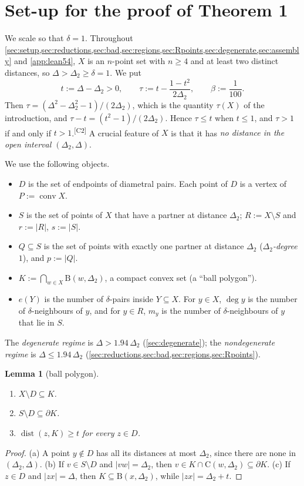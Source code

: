 \documentclass[11pt]{amsart}
\newtheorem{lemma}[theorem]{Lemma}
\theoremstyle{definition}
\theoremstyle{remark}
\newcommand{\Dt}{\Delta_2}
\newcommand{\conv}{\operatorname{conv}}
\newcommand{\dist}{\operatorname{dist}}
\newcommand{\Cc}{\mathrm{C}}      %
\newcommand{\Dd}{\mathrm{B}}      %
\newcommand{\chk}[1]{\textsuperscript{[#1]}}
\begin{document}
\section{Set-up for the proof of Theorem 1}\label{sec:setup}

We scale so that $\delta=1$. Throughout \cref{sec:setup,sec:reductions,sec:bad,sec:regions,sec:Rpoints,sec:degenerate,sec:assembly} and \cref{app:lean54}, $X$ is an $n$-point set with $n\ge 4$ and at least two distinct distances, so $\Delta>\Dt\ge\delta=1$. We put
\[
t:=\Delta-\Dt>0,\qquad \tau:=t-\frac{1-t^2}{2\Dt},\qquad \beta:=\frac1{100}.
\]
Then $\tau=(\Delta^2-\Dt^2-1)/(2\Dt)$, which is the quantity $\tau(X)$ of the introduction, and $\tau-t=(t^2-1)/(2\Dt)$. Hence $\tau\le t$ when $t\le 1$, and $\tau>1$ if and only if $t>1$.\chk{C2} A crucial feature of $X$ is that it has \emph{no distance in the open interval $(\Dt,\Delta)$}.

We use the following objects.
\begin{itemize}[leftmargin=2em]
\item $D$ is the set of endpoints of diametral pairs. Each point of $D$ is a vertex of $P:=\conv X$.
\item $S$ is the set of points of $X$ that have a partner at distance $\Dt$; $R:=X\setminus S$ and $r:=|R|$, $s:=|S|$.
\item $Q\subseteq S$ is the set of points with exactly one partner at distance $\Dt$ (\emph{$\Dt$-degree} $1$), and $p:=|Q|$.
\item $K:=\bigcap_{w\in X}\Dd(w,\Dt)$, a compact convex set (a ``ball polygon'').
\item $e(Y)$ is the number of $\delta$-pairs inside $Y\subseteq X$. For $y\in X$, $\deg y$ is the number of $\delta$-neighbours of $y$, and for $y\in R$, $m_y$ is the number of $\delta$-neighbours of $y$ that lie in $S$.
\end{itemize}
The \emph{degenerate regime} is $\Delta>1.94\,\Dt$ (\cref{sec:degenerate}); the \emph{nondegenerate regime} is $\Delta\le 1.94\,\Dt$ (\cref{sec:reductions,sec:bad,sec:regions,sec:Rpoints}).

\begin{lemma}[ball polygon]\label{lem:ballpoly}
\begin{enumerate}[label=(\alph*)]
\item $X\setminus D\subseteq K$.
\item $S\setminus D\subseteq\partial K$.
\item $\dist(z,K)\ge t$ for every $z\in D$.
\end{enumerate}
\end{lemma}
\begin{proof}
(a) A point $y\notin D$ has all its distances at most $\Dt$, since there are none in $(\Dt,\Delta)$. (b) If $v\in S\setminus D$ and $|vw|=\Dt$, then $v\in K\cap \Cc(w,\Dt)\subseteq\partial K$. (c) If $z\in D$ and $|zx|=\Delta$, then $K\subseteq\Dd(x,\Dt)$, while $|zx|=\Dt+t$.
\end{proof}
\end{document}
